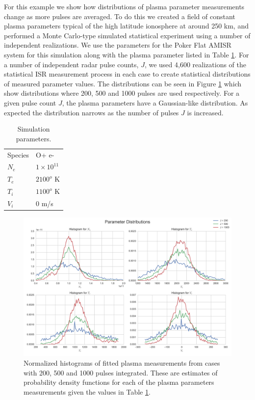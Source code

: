 \documentclass[draft,ras]{agutex}
\begin{document}
\begin{article}
For this example we show how distributions of plasma parameter measurements change as more pulses are averaged. To do this we created a field of constant plasma parameters typical of the high latitude ionosphere at around 250 km, and performed a Monte Carlo-type simulated statistical experiment using a number of independent realizations. We use the parameters for the Poker Flat AMISR system for this simulation along with the plasma parameter listed in Table \ref{tb:param1}. For a number of independent radar pulse counts, $J$, we used 4,600 realizations of the statistical ISR measurement process in each case to create statistical distributions of measured parameter values. The distributions can be seen in Figure \ref{fig:statshistall} which show distributions where 200, 500 and 1000 pulses are used respectively. For a given pulse count $J$, the plasma parameters have a Gaussian-like distribution. As expected the distribution narrows as the number of pulses $J$ is increased.  

\begin{table}[!t]
\centering
\caption{Simulation parameters.}
\label{tb:param1}
\begin{tabular}{ll}
Species & O+ e-\\
$N_e$    & $1\times 10^{11}$ \\
$T_e$      & $2100^o$ K   \\
$T_i$      & $1100^o$ K \\
$V_i$      & $0$ m/s
\end{tabular}
\end{table}

\begin{figure}[!t]
\centering
\includegraphics[width=5in]{datahist}
\caption{Normalized histograms of fitted plasma measurements from cases with 200, 500 and 1000 pulses integrated. These are estimates of probability density functions for each of the plasma parameters measurements given the values in Table \ref{tb:param1}.}
\label{fig:statshistall}
\end{figure}


\end{article}
\end{document}

